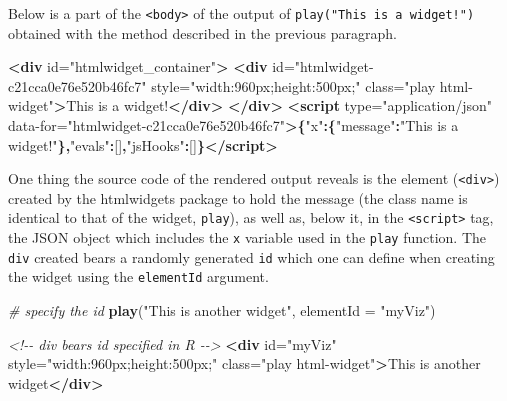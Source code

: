 \documentclass[
]{krantz}
\makeatletter
\newenvironment{Shaded}{\begin{snugshade}}{\end{snugshade}}
\newcommand{\CommentTok}[1]{\textcolor[rgb]{0.37,0.37,0.37}{\textit{#1}}}
\newcommand{\DataTypeTok}[1]{\textcolor[rgb]{0.27,0.27,0.27}{#1}}
\newcommand{\KeywordTok}[1]{\textcolor[rgb]{0.27,0.27,0.27}{\textbf{#1}}}
\newcommand{\NormalTok}[1]{#1}
\newcommand{\OperatorTok}[1]{\textcolor[rgb]{0.43,0.43,0.43}{\textbf{#1}}}
\newcommand{\OtherTok}[1]{\textcolor[rgb]{0.37,0.37,0.37}{#1}}
\newcommand{\StringTok}[1]{\textcolor[rgb]{0.5,0.5,0.5}{#1}}
\newenvironment{kframe}{%
\medskip{}
\setlength{\fboxsep}{.8em}
 \def\at@end@of@kframe{}%
 \ifinner\ifhmode%
  \def\at@end@of@kframe{\end{minipage}}%
  \begin{minipage}{\columnwidth}%
 \fi\fi%
 \def\FrameCommand##1{\hskip\@totalleftmargin \hskip-\fboxsep
 \colorbox{shadecolor}{##1}\hskip-\fboxsep
     \hskip-\linewidth \hskip-\@totalleftmargin \hskip\columnwidth}%
 \MakeFramed {\advance\hsize-\width
   \@totalleftmargin\z@ \linewidth\hsize
   \@setminipage}}%
 {\par\unskip\endMakeFramed%
 \at@end@of@kframe}
\renewenvironment{Shaded}{\begin{kframe}}{\end{kframe}}
\makeatother
\begin{document}
Below is a part of the \texttt{\textless{}body\textgreater{}} of the output of \texttt{play("This\ is\ a\ widget!")} obtained with the method described in the previous paragraph.

\begin{Shaded}
\begin{Highlighting}[]
\KeywordTok{<div}\OtherTok{ id=}\StringTok{"htmlwidget\_container"}\KeywordTok{>}
  \KeywordTok{<div}\OtherTok{ id=}\StringTok{"htmlwidget{-}c21cca0e76e520b46fc7"}\OtherTok{ style=}\StringTok{"width:960px;height:500px;"}\OtherTok{ class=}\StringTok{"play html{-}widget"}\KeywordTok{>}\NormalTok{This is a widget!}\KeywordTok{</div>}
\KeywordTok{</div>}
\KeywordTok{<script}\OtherTok{ type=}\StringTok{"application/json"}\OtherTok{ data{-}for=}\StringTok{"htmlwidget{-}c21cca0e76e520b46fc7"}\KeywordTok{>}\OperatorTok{\{}\StringTok{"x"}\OperatorTok{:\{}\StringTok{"message"}\OperatorTok{:}\StringTok{"This is a widget!"}\OperatorTok{\},}\StringTok{"evals"}\OperatorTok{:}\NormalTok{[]}\OperatorTok{,}\StringTok{"jsHooks"}\OperatorTok{:}\NormalTok{[]}\OperatorTok{\}}\KeywordTok{</script>}
\end{Highlighting}
\end{Shaded}

One thing the source code of the rendered output reveals is the element (\texttt{\textless{}div\textgreater{}}) created by the htmlwidgets package to hold the message (the class name is identical to that of the widget, \texttt{play}), as well as, below it, in the \texttt{\textless{}script\textgreater{}} tag, the JSON object which includes the \texttt{x} variable used in the \texttt{play} function. The \texttt{div} created bears a randomly generated \texttt{id} which one can define when creating the widget using the \texttt{elementId} argument.

\begin{Shaded}
\begin{Highlighting}[]
\CommentTok{\# specify the id}
\KeywordTok{play}\NormalTok{(}\StringTok{"This is another widget"}\NormalTok{, }\DataTypeTok{elementId =} \StringTok{"myViz"}\NormalTok{)}
\end{Highlighting}
\end{Shaded}

\begin{Shaded}
\begin{Highlighting}[]
\CommentTok{<!{-}{-} div bears id specified in R {-}{-}>}
\KeywordTok{<div}\OtherTok{ id=}\StringTok{"myViz"}\OtherTok{ style=}\StringTok{"width:960px;height:500px;"}\OtherTok{ class=}\StringTok{"play html{-}widget"}\KeywordTok{>}\NormalTok{This is another widget}\KeywordTok{</div>}
\end{Highlighting}
\end{Shaded}
\end{document}
